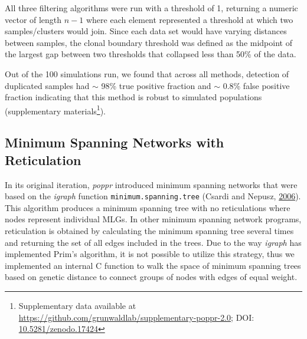 \documentclass[double,12pt]{beavtex}
\begin{document}
  All three filtering algorithms were run with a threshold of 1, returning
  a numeric vector of length \(n - 1\) where each element represented a
  threshold at which two samples/clusters would join. Since each data set
  would have varying distances between samples, the clonal boundary
  threshold was defined as the midpoint of the largest gap between two
  thresholds that collapsed less than 50\% of the data.
  
  Out of the 100 simulations run, we found that across all methods,
  detection of duplicated samples had \(\sim\) 98\% true positive fraction
  and \(\sim\) 0.8\% false positive fraction indicating that this method
  is robust to simulated populations (supplementary materials\footnote{Supplementary
    data available at
    \url{https://github.com/grunwaldlab/supplementary-poppr-2.0}; DOI:
    \href{http://dx.doi.org/10.5281/zenodo.17424}{10.5281/zenodo.17424}}).
  
  \subsection{Minimum Spanning Networks with
  Reticulation}\label{minimum-spanning-networks-with-reticulation}
  
  In its original iteration, \emph{poppr} introduced minimum spanning
  networks that were based on the \emph{igraph} function
  \texttt{minimum.spanning.tree} (Csardi and Nepusz,
  \protect\hyperlink{ref-csardi2006igraph}{2006}). This algorithm produces
  a minimum spanning tree with no reticulations where nodes represent
  individual MLGs. In other minimum spanning network programs,
  reticulation is obtained by calculating the minimum spanning tree
  several times and returning the set of all edges included in the trees.
  Due to the way \emph{igraph} has implemented Prim's algorithm, it is not
  possible to utilize this strategy, thus we implemented an internal C
  function to walk the space of minimum spanning trees based on genetic
  distance to connect groups of nodes with edges of equal weight.
  
\end{document}
